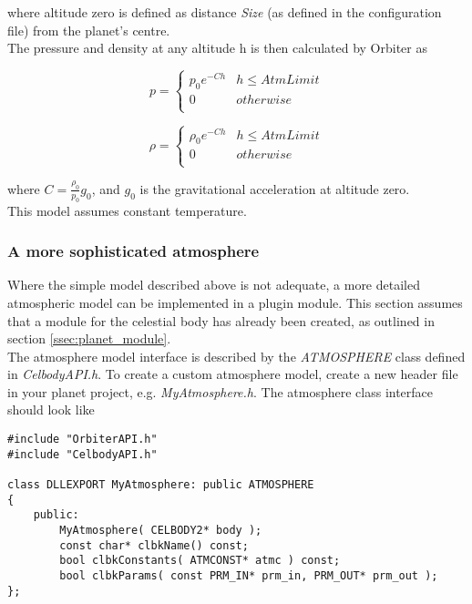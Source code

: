 \documentclass[Orbiter Developer Manual.tex]{subfiles}
\begin{document}
\noindent
where altitude zero is defined as distance \textit{Size} (as defined in the configuration file) from the planet's centre.\\
The pressure and density at any altitude h is then calculated by Orbiter as

\[ p =
\left\{
\begin{array}{ll}
	p_{0}e^{-Ch} & h \leq AtmLimit \\
	0 & otherwise \\
\end{array} 
\right. \]

\[ \rho =
\left\{
\begin{array}{ll}
	\rho_{0}e^{-Ch} & h \leq AtmLimit \\
	0 & otherwise \\
\end{array} 
\right. \]

\noindent
where $C = \frac{\rho_{0}}{p_{0}}g_{0}$, and $g_{0}$ is the gravitational acceleration at altitude zero.\\
This model assumes constant temperature.


\subsubsection{A more sophisticated atmosphere}
Where the simple model described above is not adequate, a more detailed atmospheric model can be implemented in a plugin module. This section assumes that a module for the celestial body has already been created, as outlined in section \ref{ssec:planet_module}.\\
The atmosphere model interface is described by the \textit{ATMOSPHERE} class defined in \textit{CelbodyAPI.h}. To create a custom atmosphere model, create a new header file in your planet project, e.g. \textit{MyAtmosphere.h}. The atmosphere class interface should look like

\begin{lstlisting}
#include "OrbiterAPI.h"
#include "CelbodyAPI.h"

class DLLEXPORT MyAtmosphere: public ATMOSPHERE
{
	public:
		MyAtmosphere( CELBODY2* body );
		const char* clbkName() const;
		bool clbkConstants( ATMCONST* atmc ) const;
		bool clbkParams( const PRM_IN* prm_in, PRM_OUT* prm_out );
};
\end{lstlisting}
\end{document}

